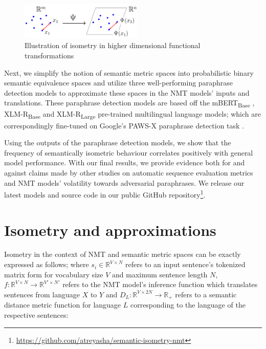 \documentclass[11pt,a4paper]{article}
\begin{document}
\begin{figure}
  \centering \includegraphics[trim={0cm 0cm 0cm
    0cm},clip,width=0.52\textwidth]{isometry_visualized_modified.png}
  \caption{Illustration of isometry in higher dimensional functional
    transformations \citep{Hegde-Numax}}
  \label{isometry_visual}
\end{figure}

Next, we simplify the notion of semantic metric spaces into probabilistic binary
semantic equivalence spaces and utilize three well-performing paraphrase
detection models to approximate these spaces in the NMT models' inputs and
translations. These paraphrase detection models are based off the
mBERT\textsubscript{Base} \cite{devlin-etal-2019-bert},
XLM-R\textsubscript{Base} \cite{conneau2019unsupervised} and
XLM-R\textsubscript{Large} \cite{conneau2019unsupervised} pre-trained
multilingual language models; which are correspondingly fine-tuned on Google's
PAWS-X paraphrase detection task \cite{pawsx2019emnlp, hu2020xtreme}.

Using the outputs of the paraphrase detection models, we show that the frequency
of semantically isometric behaviour correlates positively with general model
performance. With our final results, we provide evidence both for and against
claims made by other studies on automatic sequence evaluation metrics and NMT
models' volatility towards adversarial paraphrases. We release our latest models
and source code in our public GitHub
repository\footnote{\url{https://github.com/atreyasha/semantic-isometry-nmt}}.

\section{Isometry and approximations}

Isometry in the context of NMT and semantic metric spaces can be exactly
expressed as follows; where $s_i \in \mathbb{R}^{V \times N}$ refers to an input
sentence's tokenized matrix form for vocabulary size $V$ and maximum sentence
length $N$, $f: \mathbb{R}^{V \times N} \to \mathbb{R}^{V' \times N'}$ refers to
the NMT model's inference function which translates sentences from language $X$
to $Y$ and $D_L: \mathbb{R}^{V \times 2N} \to \mathbb{R}_+$ refers to a semantic
distance metric function for language $L$ corresponding to the language of the
respective sentences:
\end{document}
